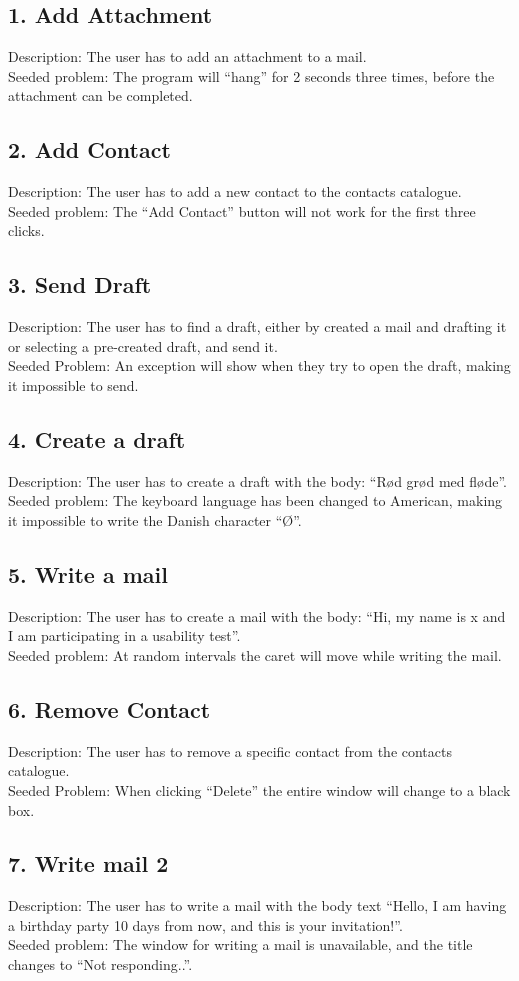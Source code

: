 \subsection*{1. Add Attachment}  
Description: The user has to add an attachment to a mail.\\
Seeded problem: The program will ``hang'' for 2 seconds three times, before the attachment can be completed.
\subsection*{2. Add Contact}
Description: The user has to add a new contact to the contacts catalogue.\\
Seeded problem: The ``Add Contact'' button will not work for the first three clicks.
\subsection*{3. Send Draft}
Description: The user has to find a draft, either by created a mail and drafting it or selecting a pre-created draft, and send it.\\
Seeded Problem: An exception will show when they try to open the draft, making it impossible to send.
\subsection*{4. Create a draft}
Description: The user has to create a draft with the body: ``Rød grød med fløde''.\\
Seeded problem: The keyboard language has been changed to American, making it impossible to write the Danish character ``Ø''.
\subsection*{5. Write a mail}
Description: The user has to create a mail with the body: ``Hi, my name is x and I am participating in a usability test''.\\
Seeded problem: At random intervals the caret will move while writing the mail.
\subsection*{6. Remove Contact}
Description: The user has to remove a specific contact from the contacts catalogue.\\
Seeded Problem: When clicking ``Delete'' the entire window will change to a black box.
\subsection*{7. Write mail 2}
Description: The user has to write a mail with the body text ``Hello, I am having a birthday party 10 days from now, and this is your invitation!''.\\
Seeded problem: The window for writing a mail is unavailable, and the title changes to ``Not responding..''.
